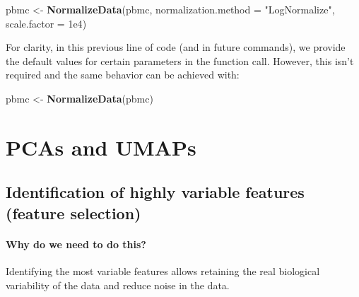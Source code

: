 \documentclass[
]{book}
\newenvironment{Shaded}{\begin{snugshade}}{\end{snugshade}}
\newcommand{\AttributeTok}[1]{\textcolor[rgb]{0.13,0.29,0.53}{#1}}
\newcommand{\FloatTok}[1]{\textcolor[rgb]{0.00,0.00,0.81}{#1}}
\newcommand{\FunctionTok}[1]{\textcolor[rgb]{0.13,0.29,0.53}{\textbf{#1}}}
\newcommand{\NormalTok}[1]{#1}
\newcommand{\OtherTok}[1]{\textcolor[rgb]{0.56,0.35,0.01}{#1}}
\newcommand{\StringTok}[1]{\textcolor[rgb]{0.31,0.60,0.02}{#1}}
\begin{document}
\begin{Shaded}
\begin{Highlighting}[]
\NormalTok{pbmc }\OtherTok{\textless{}{-}} \FunctionTok{NormalizeData}\NormalTok{(pbmc, }\AttributeTok{normalization.method =} \StringTok{"LogNormalize"}\NormalTok{, }\AttributeTok{scale.factor =} \FloatTok{1e4}\NormalTok{)}
\end{Highlighting}
\end{Shaded}

For clarity, in this previous line of code (and in future commands), we provide the default values for certain parameters in the function call. However, this isn't required and the same behavior can be achieved with:

\begin{Shaded}
\begin{Highlighting}[]
\NormalTok{pbmc }\OtherTok{\textless{}{-}} \FunctionTok{NormalizeData}\NormalTok{(pbmc)}
\end{Highlighting}
\end{Shaded}

\hypertarget{reducedims}{%
\chapter{PCAs and UMAPs}\label{reducedims}}

\hypertarget{identification-of-highly-variable-features-feature-selection}{%
\section{Identification of highly variable features (feature selection)}\label{identification-of-highly-variable-features-feature-selection}}

\hypertarget{why-do-we-need-to-do-this-2}{%
\subsubsection*{Why do we need to do this?}\label{why-do-we-need-to-do-this-2}}

Identifying the most variable features allows retaining the real biological variability of the data and reduce noise in the data.

\hypertarget{section-4}{%
\subsubsection*{}\label{section-4}}
\end{document}

